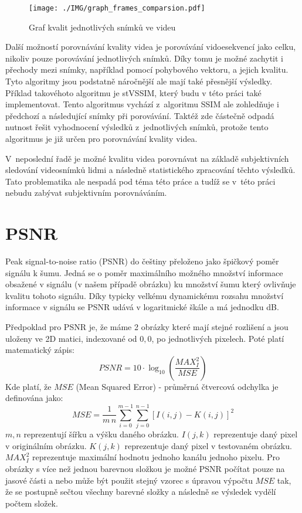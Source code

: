 \documentclass[thesis=M,czech]{FITthesis}[2016/06/26]
\begin{document}
\begin{figure}\centering
\texttt{[image: ./IMG/graph\_frames\_comparsion.pdf]}
\caption{Graf kvalit jednotlivých snímků ve videu}
\label{fig:frames_comparsion}
\end{figure}


Další možností porovnávání kvality videa je porovávání vidoesekvencí jako celku, nikoliv pouze porovávání jednotlivých snímků. Díky tomu je možné zachytit i přechody mezi snímky, například pomocí pohybového vektoru, a jejich kvalitu. Tyto algoritmy jsou podstatně náročnější ale mají také přesnější výsledky. Příklad takovéhoto algoritmu je stVSSIM, který budu v této práci také implementovat. Tento algoritmus vychází z~algoritmu SSIM ale zohledňuje i předchozí a následující snímky při porovávání. Taktéž zde částečně odpadá nutnost řešit vyhodnocení výsledků z~jednotlivých snímků, protože tento algoritmus je již určen pro porovnávání kvality videa.

V~neposlední řadě je možné kvalitu videa porovnávat na základě subjektivních sledování videosnímků lidmi a následně statistického zpracování těchto výsledků. Tato problematika ale nespadá pod téma této práce a tudíž se v~této práci nebudu zabývat subjektivním porovnáváním.
\section{PSNR}
Peak signal-to-noise ratio (PSNR) do češtiny přeloženo jako špičkový poměr signálu k šumu\cite{PSNR}. Jedná se o poměr maximálního možného množství informace obsažené v signálu (v našem případě obrázku) ku množství šumu který ovlivňuje kvalitu tohoto signálu. Díky typicky velkému dynamickému rozsahu množství informace v signálu se PSNR udává v logaritmické škále a má jednodku dB.

Předpoklad pro PSNR je, že máme 2 obrázky které mají stejné rozlišení a jsou uloženy ve 2D matici, indexované od $0,0$,  po jednotlivých pixelech. \newline
Poté platí matematický zápis:
\begin{equation}
\mathit{PSNR} = 10 \cdot \log_{10} \left( \frac{\mathit{MAX}_I^2}{\mathit{MSE}} \right)
\end{equation}
Kde platí, že $\mathit{MSE}$ (Mean Squared Error) - průměrná čtvercová odchylka je definována jako:
\begin{equation}
\mathit{MSE} = \frac{1}{m\,n}\sum_{i=0}^{m-1}\sum_{j=0}^{n-1} [I(i,j) - K(i,j)]^2
\end{equation}
$\mathit{m,n}$ reprezentují šířku a výšku daného obrázku. \newline
$\mathit{I(j,k)}$ reprezentuje daný pixel v originálním obrázku. \newline
$\mathit{K(j,k)}$ reprezentuje daný pixel v testovaném obrázku. \newline
$\mathit{MAX}_I^2$ reprezentuje maximální hodnotu jednoho kanálu jednoho pixelu. \newline
Pro obrázky s více než jednou barevnou složkou je možné PSNR počítat pouze na jasové části a nebo může být použit stejný vzorec s úpravou výpočtu $\mathit{MSE}$ tak, že se postupně sečtou všechny barevné složky a následně se výsledek vydělí počtem složek\cite{PSNR2}.
\end{document}
